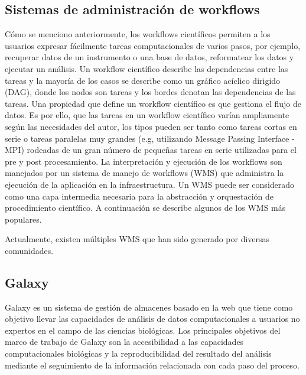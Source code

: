 


\subsection{Sistemas de administración de workflows}

Cómo se menciono anteriormente, los workflows científicos permiten a los usuarios expresar fácilmente tareas computacionales de varios pasos, por ejemplo, recuperar datos de un instrumento o una base de datos, reformatear los datos y ejecutar un análisis. 
Un workflow científico describe las dependencias entre las tareas y la mayoría de los casos se describe como un gráfico acíclico dirigido (DAG), donde los nodos son tareas y los bordes denotan las dependencias de las tareas.
Una propiedad que define un workflow científico es que gestiona el flujo de datos. Es por ello, que las tareas en un  workflow científico varían ampliamente según las necesidades del autor, los tipos pueden ser tanto como tareas cortas en serie o tareas paralelas muy grandes (e.g, utilizando Message Passing Interface - MPI) rodeadas de un gran número de pequeñas tareas en serie utilizadas para el pre y post procesamiento.
La interpretación y ejecución de los workflows son manejados por un sistema de manejo de workflows (WMS) que administra la ejecución de la aplicación en la infraestructura. 
Un WMS puede ser considerado como una capa intermedia necesaria para la abstracción y orquestación de procedimiento científico. A continuación se describe algunos de los WMS más populares.

Actualmente, existen múltiples WMS que han sido generado por diversas comunidades.
\subsection{Galaxy}	
Galaxy \cite{goecks2010galaxy} es un sistema de gestión de almacenes basado en la web que tiene como objetivo llevar las capacidades de análisis de datos computacionales a usuarios no expertos en el campo de las ciencias biológicas. Los principales objetivos del marco de trabajo de Galaxy son la accesibilidad a las capacidades computacionales biológicas y la reproducibilidad del resultado del análisis mediante el seguimiento de la información relacionada con cada paso del proceso. 
